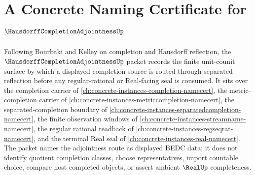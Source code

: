 \chapter{A Concrete Naming Certificate for $\HausdorffCompletionAdjointnessUp$}
\label{ch:concrete-instances-hausdorff-completion-adjointness-namecert}

Following Bourbaki and Kelley on completion and Hausdorff reflection, the $\HausdorffCompletionAdjointnessUp$ packet records the finite unit-counit surface by which a displayed completion source is routed through separated reflection before any regular-rational or Real-facing seal is consumed. It sits over the completion carrier of \autoref{ch:concrete-instances-completion-namecert}, the metric-completion carrier of \autoref{ch:concrete-instances-metriccompletion-namecert}, the separated-completion boundary of \autoref{ch:concrete-instances-separatedcompletion-namecert}, the finite observation windows of \autoref{ch:concrete-instances-streamname-namecert}, the regular rational readback of \autoref{ch:concrete-instances-regseqrat-namecert}, and the terminal Real seal of \autoref{ch:concrete-instances-real-namecert}. The packet names the adjointness route as displayed BEDC data; it does not identify quotient completion classes, choose representatives, import countable choice, compare host completed objects, or assert ambient $\RealUp$ completeness.

